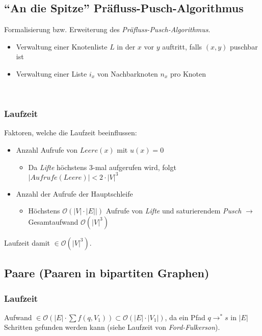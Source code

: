 \subsection{"`An die Spitze"' Präfluss-Pusch-Algorithmus}
Formalisierung bzw. Erweiterung des \textit{Präfluss-Pusch-Algorithmus}.
\begin{itemize}
	\item Verwaltung einer Knotenliste \(L\) in der \(x\) vor \(y\) auftritt, falls \((x,y)\) puschbar ist
	\item Verwaltung einer Liste \(i_x\) von Nachbarknoten \(n_x\) pro Knoten
\end{itemize}

\text{}\\


\subsubsection{Laufzeit}
Faktoren, welche die Laufzeit beeinflussen:
\begin{itemize}
	\item Anzahl Aufrufe von \(Leere(x)\) mit \(u(x) = 0\)
	\begin{itemize}
		\item Da \textit{Lifte} höchstens \(3\)-mal aufgerufen wird, folgt \(|Aufrufe(Leere)| < 2\cdot |V|^3\)
	\end{itemize}
	\item Anzahl der Aufrufe der Hauptschleife
	\begin{itemize}
		\item Höchstens \(\mathcal{O}(|V| \cdot |E||)\) Aufrufe von \textit{Lifte} und saturierendem \textit{Pusch} \(\rightarrow\) Gesamtaufwand \(\mathcal{O}(|V|^3)\)
	\end{itemize}
\end{itemize}
Laufzeit damit \(\in \mathcal{O}(|V|^3)\).



\subsection{Paare (Paaren in bipartiten Graphen)}


\subsubsection{Laufzeit}
Aufwand \(\in \mathcal{O}(|E|\cdot \sum f(q, V_1)) \subset \mathcal{O}(|E| \cdot |V_1|)\), da ein Pfad \(q \rightarrow^* s\) in \(|E|\) Schritten gefunden werden kann (siehe Laufzeit von \textit{Ford-Fulkerson}).

